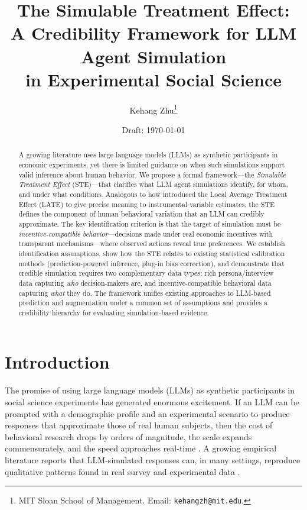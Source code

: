 \documentclass[12pt]{article}
\title{The Simulable Treatment Effect:\\ A Credibility Framework for LLM Agent Simulation\\ in Experimental Social Science}
\author{
  Kehang Zhu\thanks{MIT Sloan School of Management. Email: \texttt{kehangzh@mit.edu}.}
}
\date{Draft: \today}
\begin{document}
\maketitle

\begin{abstract}
A growing literature uses large language models (LLMs) as synthetic participants in economic experiments, yet there is limited guidance on when such simulations support valid inference about human behavior. We propose a formal framework---the \textit{Simulable Treatment Effect} (STE)---that clarifies what LLM agent simulations identify, for whom, and under what conditions. Analogous to how \citet{imbens1994identification} introduced the Local Average Treatment Effect (LATE) to give precise meaning to instrumental variable estimates, the STE defines the component of human behavioral variation that an LLM can credibly approximate. The key identification criterion is that the target of simulation must be \textit{incentive-compatible behavior}---decisions made under real economic incentives with transparent mechanisms---where observed actions reveal true preferences. We establish identification assumptions, show how the STE relates to existing statistical calibration methods (prediction-powered inference, plug-in bias correction), and demonstrate that credible simulation requires two complementary data types: rich persona/interview data capturing \textit{who} decision-makers are, and incentive-compatible behavioral data capturing \textit{what} they do. The framework unifies existing approaches to LLM-based prediction \citep{manning2026general} and augmentation \citep{broska2025mixed, ludwig2025large} under a common set of assumptions and provides a credibility hierarchy for evaluating simulation-based evidence.
\end{abstract}

\newpage
\tableofcontents
\newpage

\section{Introduction}
\label{sec:intro}

The promise of using large language models (LLMs) as synthetic participants in social science experiments has generated enormous excitement. If an LLM can be prompted with a demographic profile and an experimental scenario to produce responses that approximate those of real human subjects, then the cost of behavioral research drops by orders of magnitude, the scale expands commensurately, and the speed approaches real-time \citep{horton2023large, argyle2023out, park2024generative}. A growing empirical literature reports that LLM-simulated responses can, in many settings, reproduce qualitative patterns found in real survey and experimental data \citep{binz2023using, hewitt2024predicting, cui2025ai, manning2026general}.
\end{document}
